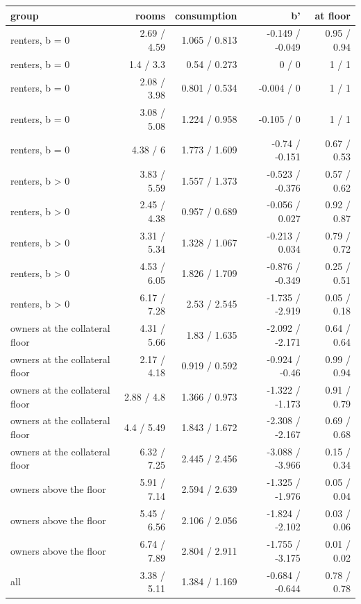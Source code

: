 \begin{tabular}{lrrrr}
\toprule
group & rooms & consumption & b' & at floor \\
\midrule
renters, b = 0 & 2.69 / 4.59 & 1.065 / 0.813 & -0.149 / -0.049 & 0.95 / 0.94 \\
renters, b = 0 & 1.4 / 3.3 & 0.54 / 0.273 & 0 / 0 & 1 / 1 \\
renters, b = 0 & 2.08 / 3.98 & 0.801 / 0.534 & -0.004 / 0 & 1 / 1 \\
renters, b = 0 & 3.08 / 5.08 & 1.224 / 0.958 & -0.105 / 0 & 1 / 1 \\
renters, b = 0 & 4.38 / 6 & 1.773 / 1.609 & -0.74 / -0.151 & 0.67 / 0.53 \\
renters, b > 0 & 3.83 / 5.59 & 1.557 / 1.373 & -0.523 / -0.376 & 0.57 / 0.62 \\
renters, b > 0 & 2.45 / 4.38 & 0.957 / 0.689 & -0.056 / 0.027 & 0.92 / 0.87 \\
renters, b > 0 & 3.31 / 5.34 & 1.328 / 1.067 & -0.213 / 0.034 & 0.79 / 0.72 \\
renters, b > 0 & 4.53 / 6.05 & 1.826 / 1.709 & -0.876 / -0.349 & 0.25 / 0.51 \\
renters, b > 0 & 6.17 / 7.28 & 2.53 / 2.545 & -1.735 / -2.919 & 0.05 / 0.18 \\
owners at the collateral floor & 4.31 / 5.66 & 1.83 / 1.635 & -2.092 / -2.171 & 0.64 / 0.64 \\
owners at the collateral floor & 2.17 / 4.18 & 0.919 / 0.592 & -0.924 / -0.46 & 0.99 / 0.94 \\
owners at the collateral floor & 2.88 / 4.8 & 1.366 / 0.973 & -1.322 / -1.173 & 0.91 / 0.79 \\
owners at the collateral floor & 4.4 / 5.49 & 1.843 / 1.672 & -2.308 / -2.167 & 0.69 / 0.68 \\
owners at the collateral floor & 6.32 / 7.25 & 2.445 / 2.456 & -3.088 / -3.966 & 0.15 / 0.34 \\
owners above the floor & 5.91 / 7.14 & 2.594 / 2.639 & -1.325 / -1.976 & 0.05 / 0.04 \\
owners above the floor & 5.45 / 6.56 & 2.106 / 2.056 & -1.824 / -2.102 & 0.03 / 0.06 \\
owners above the floor & 6.74 / 7.89 & 2.804 / 2.911 & -1.755 / -3.175 & 0.01 / 0.02 \\
all & 3.38 / 5.11 & 1.384 / 1.169 & -0.684 / -0.644 & 0.78 / 0.78 \\
\bottomrule
\end{tabular}
